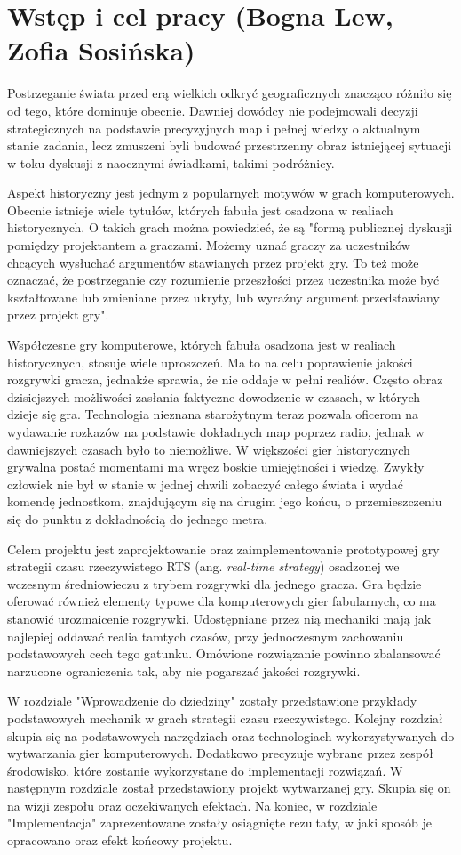 \chapter{Wstęp i cel pracy (Bogna Lew, Zofia Sosińska)}\label{chap:introduction}

Postrzeganie świata przed erą wielkich odkryć geograficznych znacząco różniło się od tego, które dominuje obecnie. Dawniej
dowódcy nie podejmowali decyzji strategicznych na podstawie precyzyjnych map i pełnej wiedzy o aktualnym stanie zadania,
lecz zmuszeni byli budować przestrzenny obraz istniejącej sytuacji w toku dyskusji z naocznymi świadkami, takimi podróżnicy.

Aspekt historyczny jest jednym z popularnych motywów w grach komputerowych. Obecnie istnieje wiele tytułów, których
fabuła jest osadzona w realiach historycznych. O takich grach można powiedzieć, że są "formą publicznej dyskusji
pomiędzy projektantem a graczami. Możemy uznać graczy za uczestników chcących wysłuchać argumentów stawianych przez
projekt gry. To też może oznaczać, że postrzeganie czy rozumienie przeszłości przez uczestnika może być kształtowane lub
zmieniane przez ukryty, lub wyraźny argument przedstawiany przez projekt gry"\cite{perception_past}.

Współczesne gry komputerowe, których fabuła osadzona jest w realiach historycznych, stosuje wiele uproszczeń. Ma to na celu poprawienie jakości
rozgrywki gracza, jednakże sprawia, że nie oddaje w pełni realiów. Często obraz dzisiejszych możliwości zasłania faktyczne dowodzenie
w czasach, w których dzieje się gra. Technologia nieznana starożytnym teraz pozwala oficerom na wydawanie rozkazów na podstawie dokładnych map poprzez radio,
jednak w dawniejszych czasach było to niemożliwe. W większości gier historycznych grywalna postać momentami ma wręcz boskie umiejętności i wiedzę. Zwykły człowiek nie był w
stanie w jednej chwili zobaczyć całego świata i wydać komendę jednostkom, znajdującym się na drugim jego końcu, o przemieszczeniu
się do punktu z dokładnością do jednego metra.

Celem projektu jest zaprojektowanie oraz zaimplementowanie prototypowej gry strategii czasu rzeczywistego RTS
(ang. \textit{real-time strategy}) osadzonej we wczesnym średniowieczu z trybem rozgrywki dla jednego gracza. Gra będzie
oferować również elementy typowe dla komputerowych gier fabularnych, co ma stanowić urozmaicenie rozgrywki. 
Udostępniane przez nią mechaniki mają jak najlepiej oddawać realia tamtych czasów, przy
jednoczesnym zachowaniu podstawowych cech tego gatunku. Omówione rozwiązanie powinno zbalansować narzucone ograniczenia tak, aby 
nie pogarszać jakości rozgrywki.

W rozdziale "Wprowadzenie do dziedziny" zostały przedstawione przykłady podstawowych mechanik w grach strategii czasu
rzeczywistego. Kolejny rozdział skupia się na podstawowych narzędziach oraz technologiach wykorzystywanych do wytwarzania
gier komputerowych. Dodatkowo precyzuje wybrane przez zespół środowisko, które zostanie wykorzystane do implementacji
rozwiązań. W następnym rozdziale został przedstawiony projekt wytwarzanej gry. Skupia się on na wizji zespołu oraz
oczekiwanych efektach. Na koniec, w rozdziale "Implementacja" zaprezentowane zostały osiągnięte rezultaty, w jaki
sposób je opracowano oraz efekt końcowy projektu.

